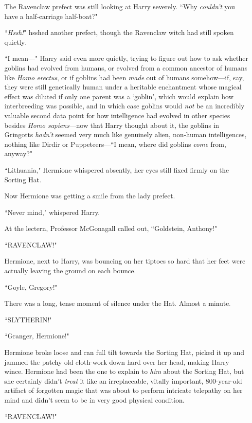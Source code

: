 The Ravenclaw prefect was still looking at Harry severely. ``Why \emph{couldn't} you have a half-carriage half-boat?"

``\emph{Hssh!}" hsshed another prefect, though the Ravenclaw witch had still spoken quietly.

``I mean—" Harry said even more quietly, trying to figure out how to ask whether goblins had evolved from humans, or evolved from a common ancestor of humans like \emph{Homo erectus}, or if goblins had been \emph{made} out of humans somehow—if, say, they were still genetically human under a heritable enchantment whose magical effect was diluted if only one parent was a `goblin', which would explain how interbreeding was possible, and in which case goblins would \emph{not} be an incredibly valuable second data point for how intelligence had evolved in other species besides \emph{Homo sapiens}—now that Harry thought about it, the goblins in Gringotts \emph{hadn't} seemed very much like genuinely alien, non-human intelligences, nothing like Dirdir or Puppeteers—``I mean, where did goblins \emph{come} from, anyway?"

``Lithuania," Hermione whispered absently, her eyes still fixed firmly on the Sorting Hat.

Now Hermione was getting a smile from the lady prefect.

``Never mind," whispered Harry.

At the lectern, Professor McGonagall called out, ``Goldstein, Anthony!"

``RAVENCLAW!"

Hermione, next to Harry, was bouncing on her tiptoes so hard that her feet were actually leaving the ground on each bounce.

``Goyle, Gregory!"

There was a long, tense moment of silence under the Hat. Almost a minute.

``SLYTHERIN!"

``Granger, Hermione!"

Hermione broke loose and ran full tilt towards the Sorting Hat, picked it up and jammed the patchy old cloth-work down hard over her head, making Harry wince. Hermione had been the one to explain to \emph{him} about the Sorting Hat, but she certainly didn't \emph{treat} it like an irreplaceable, vitally important, 800-year-old artifact of forgotten magic that was about to perform intricate telepathy on her mind and didn't seem to be in very good physical condition.

``RAVENCLAW!"

